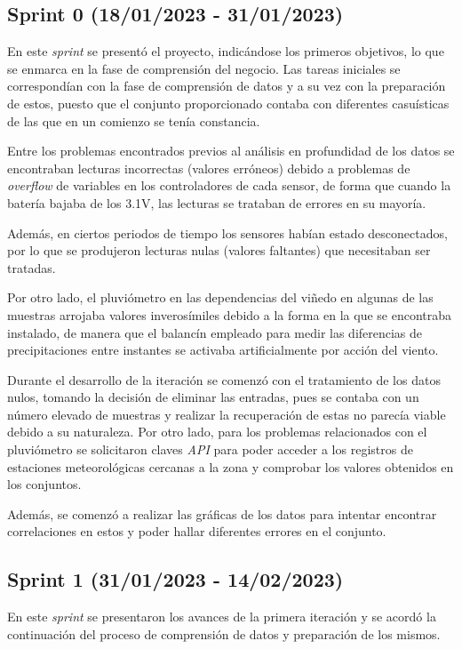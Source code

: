 \subsection{Sprint 0 (18/01/2023 - 31/01/2023)}
En este \textit{sprint} se presentó el proyecto, indicándose los primeros objetivos, lo que se enmarca en la fase de comprensión
del negocio.
Las tareas iniciales se correspondían con la fase de comprensión de datos y a su vez con la preparación de estos, 
puesto que el conjunto proporcionado contaba con diferentes casuísticas de las que en un comienzo se tenía constancia.

Entre los problemas encontrados previos al análisis en profundidad de los datos se encontraban lecturas incorrectas (valores erróneos) 
debido a problemas de \textit{overflow} de variables en los controladores de cada sensor, de forma que cuando la batería bajaba
de los 3.1V, las lecturas se trataban de errores en su mayoría.

Además, en ciertos periodos de tiempo los sensores habían estado desconectados, por lo que se produjeron lecturas nulas (valores faltantes)
que necesitaban ser tratadas.

Por otro lado, el pluviómetro en las dependencias del viñedo en algunas de las muestras arrojaba valores
inverosímiles debido a la forma en la que se encontraba instalado, de manera que el balancín empleado para medir las diferencias de 
precipitaciones entre instantes se activaba artificialmente por acción del viento.

Durante el desarrollo de la iteración se comenzó con el tratamiento de los datos nulos, tomando la decisión de eliminar las entradas, pues se
contaba con un número elevado de muestras y realizar la recuperación de estas no parecía viable debido a su naturaleza.
Por otro lado, para los problemas relacionados con el pluviómetro se solicitaron claves \textit{API} para poder acceder a los registros 
de estaciones meteorológicas cercanas a la zona y comprobar los valores obtenidos en los conjuntos.

Además, se comenzó a realizar las gráficas de los datos para intentar encontrar correlaciones en estos y poder hallar diferentes 
errores en el conjunto.

\subsection{Sprint 1 (31/01/2023 - 14/02/2023)}
En este \textit{sprint} se presentaron los avances de la primera iteración y se acordó la continuación del proceso de comprensión de datos y 
preparación de los mismos.

